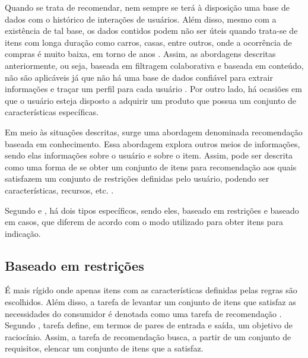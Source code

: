 Quando se trata de recomendar, nem sempre se terá à disposição uma base de dados com o histórico de interações de usuários. Além disso, mesmo com a existência de tal base, os dados contidos podem não ser úteis quando trata-se de itens com longa duração como carros, casas, entre outros, onde a ocorrência de compras é muito baixa, em torno de anos \cite{Jannach2010}. Assim, as abordagens descritas anteriormente, ou seja, baseada em filtragem colaborativa e baseada em conteúdo, não são aplicáveis já que não há uma base de dados confiável para extrair informações e traçar um perfil para cada usuário  \cite{Ricci2010}. Por outro lado, há ocasiões em que o usuário esteja disposto a adquirir um produto que possua um conjunto de características específicas. 

Em meio às situações descritas, surge uma abordagem denominada recomendação baseada em conhecimento. Essa abordagem explora outros meios de informações, sendo elas informações sobre o usuário e sobre o item.
Assim, pode ser descrita como uma forma de se obter um conjunto de itens para recomendação aos quais satisfazem um conjunto de restrições definidas pelo usuário, podendo ser características, recursos, etc. \cite{Jannach2010}.

Segundo  e , há dois tipos específicos, sendo eles, baseado em restrições e baseado em casos, que diferem de acordo com o modo utilizado para obter itens para indicação.

\subsection{Baseado em restrições}
    É mais rígido onde apenas itens com as características definidas pelas regras são escolhidos. Além disso, a tarefa de levantar um conjunto de itens que satisfaz as necessidades do consumidor é denotada como uma tarefa de recomendação \cite{Ricci2010}. Segundo , tarefa define, em termos de pares de entrada e saída, um objetivo de raciocínio. Assim, a tarefa de recomendação busca, a partir de um conjunto de requisitos, elencar um conjunto de itens que a satisfaz.
    
    
